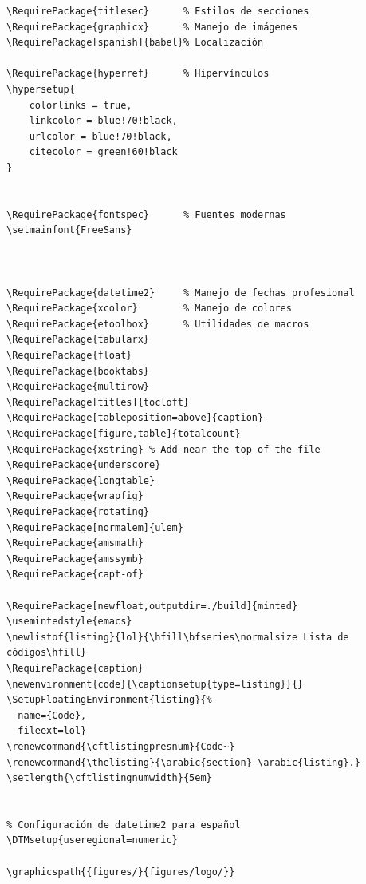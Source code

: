 \documentclass{reporti}
\begin{document}
\begin{verbatim}
\RequirePackage{titlesec}      % Estilos de secciones
\RequirePackage{graphicx}      % Manejo de imágenes
\RequirePackage[spanish]{babel}% Localización

\RequirePackage{hyperref}      % Hipervínculos
\hypersetup{
    colorlinks = true,
    linkcolor = blue!70!black,
    urlcolor = blue!70!black,
    citecolor = green!60!black
}


\RequirePackage{fontspec}      % Fuentes modernas
\setmainfont{FreeSans}



\RequirePackage{datetime2}     % Manejo de fechas profesional
\RequirePackage{xcolor}        % Manejo de colores
\RequirePackage{etoolbox}      % Utilidades de macros
\RequirePackage{tabularx}
\RequirePackage{float}
\RequirePackage{booktabs}
\RequirePackage{multirow}
\RequirePackage[titles]{tocloft}
\RequirePackage[tableposition=above]{caption}
\RequirePackage[figure,table]{totalcount}
\RequirePackage{xstring} % Add near the top of the file
\RequirePackage{underscore}
\RequirePackage{longtable}
\RequirePackage{wrapfig}
\RequirePackage{rotating}
\RequirePackage[normalem]{ulem}
\RequirePackage{amsmath}
\RequirePackage{amssymb}
\RequirePackage{capt-of}

\RequirePackage[newfloat,outputdir=./build]{minted}
\usemintedstyle{emacs}
\newlistof{listing}{lol}{\hfill\bfseries\normalsize Lista de códigos\hfill}
\RequirePackage{caption}
\newenvironment{code}{\captionsetup{type=listing}}{}
\SetupFloatingEnvironment{listing}{%
  name={Code},
  fileext=lol}
\renewcommand{\cftlistingpresnum}{Code~}
\renewcommand{\thelisting}{\arabic{section}-\arabic{listing}.}
\setlength{\cftlistingnumwidth}{5em}


% Configuración de datetime2 para español
\DTMsetup{useregional=numeric}

\graphicspath{{figures/}{figures/logo/}}
\end{verbatim}
\end{document}
